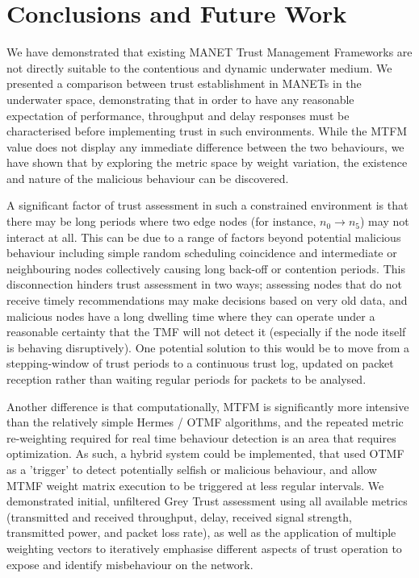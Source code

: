 \documentclass[conference]{IEEEtran}
\begin{document}
\section{Conclusions and Future Work}
We have demonstrated that existing MANET Trust Management Frameworks are not directly suitable to the contentious and dynamic underwater medium.
We presented a comparison between trust establishment in MANETs in the underwater space, demonstrating that in order to have any reasonable expectation of performance, throughput and delay responses must be characterised before implementing trust in such environments. 
While the MTFM value does not display any immediate difference between the two behaviours, we have shown that by exploring the metric space by weight variation, the existence and nature of the malicious behaviour can be discovered.

A significant factor of trust assessment in such a constrained environment is that there may be long periods where two edge nodes (for instance, $n_0 \to n_5$) may not interact at all. 
This can be due to a range of factors beyond potential malicious behaviour including simple random scheduling coincidence and intermediate or neighbouring nodes collectively causing long back-off or contention periods.
This disconnection hinders trust assessment in two ways; assessing nodes that do not receive timely recommendations may make decisions based on very old data, and malicious nodes have a long dwelling time where they can operate under a reasonable certainty that the TMF will not detect it (especially if the node itself is behaving disruptively).
One potential solution to this would be to move from a stepping-window of trust periods to a continuous trust log, updated on packet reception rather than waiting regular periods for packets to be analysed.

Another difference is that computationally, MTFM is significantly more intensive than the relatively simple Hermes / OTMF algorithms, and the repeated metric re-weighting required for real time behaviour detection is an area that requires optimization. 
As such, a hybrid system could be implemented, that used OTMF as a 'trigger' to detect potentially selfish or malicious behaviour, and allow MTMF weight matrix execution to be triggered at less regular intervals.
We demonstrated initial, unfiltered Grey Trust assessment using all available metrics (transmitted and received throughput, delay, received signal strength, transmitted power, and packet loss rate), as well as the application of multiple weighting vectors to iteratively emphasise different aspects of trust operation to expose and identify misbehaviour on the network.
\end{document}
